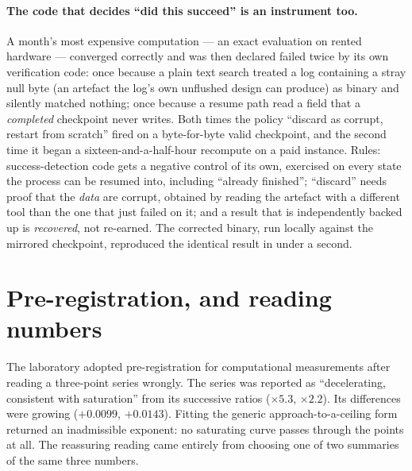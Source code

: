 \documentclass[11pt]{article}
\begin{document}
\paragraph{The code that decides ``did this succeed'' is an instrument too.} A month's most
expensive computation --- an exact evaluation on rented hardware --- converged correctly and was
then declared failed twice by its own verification code: once because a plain text search
treated a log containing a stray null byte (an artefact the log's own unflushed design can
produce) as binary and silently matched nothing; once because a resume path read a field that a
\emph{completed} checkpoint never writes. Both times the policy ``discard as corrupt, restart
from scratch'' fired on a byte-for-byte valid checkpoint, and the second time it began a
sixteen-and-a-half-hour recompute on a paid instance. Rules: success-detection code gets a negative
control of its own, exercised on every state the process can be resumed into, including
``already finished''; ``discard'' needs proof that the \emph{data} are corrupt, obtained by
reading the artefact with a different tool than the one that just failed on it; and a result
that is independently backed up is \emph{recovered}, not re-earned. The corrected binary, run
locally against the mirrored checkpoint, reproduced the identical result in under a second.

\section{Pre-registration, and reading numbers}
\label{sec:prereg}

The laboratory adopted pre-registration for computational measurements after reading a
three-point series wrongly. The series was reported as ``decelerating, consistent with
saturation'' from its successive ratios ($\times5.3$, $\times2.2$). Its differences were
growing ($+0.0099$, $+0.0143$). Fitting the generic approach-to-a-ceiling form returned an
inadmissible exponent: no saturating curve passes through the points at all. The reassuring
reading came entirely from choosing one of two summaries of the same three numbers.
\end{document}
